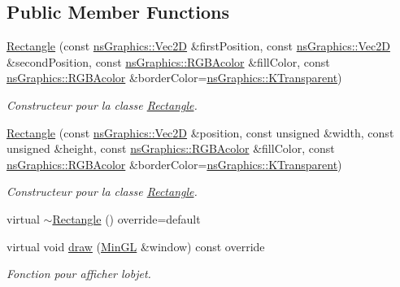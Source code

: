 \subsection*{Public Member Functions}
\begin{DoxyCompactItemize}
\item 
\hyperlink{classns_shape_1_1_rectangle_a5d5e8052ba7c35001a30ccc7dad669e2}{Rectangle} (const \hyperlink{classns_graphics_1_1_vec2_d}{ns\+Graphics\+::\+Vec2D} \&first\+Position, const \hyperlink{classns_graphics_1_1_vec2_d}{ns\+Graphics\+::\+Vec2D} \&second\+Position, const \hyperlink{classns_graphics_1_1_r_g_b_acolor}{ns\+Graphics\+::\+R\+G\+B\+Acolor} \&fill\+Color, const \hyperlink{classns_graphics_1_1_r_g_b_acolor}{ns\+Graphics\+::\+R\+G\+B\+Acolor} \&border\+Color=\hyperlink{namespacens_graphics_ab2001ad03cceb2565849e04465618c1e}{ns\+Graphics\+::\+K\+Transparent})
\begin{DoxyCompactList}\small\item\em Constructeur pour la classe \hyperlink{classns_shape_1_1_rectangle}{Rectangle}. \end{DoxyCompactList}\item 
\hyperlink{classns_shape_1_1_rectangle_a0c1c16410fb0ee7345449d7bfc9b377b}{Rectangle} (const \hyperlink{classns_graphics_1_1_vec2_d}{ns\+Graphics\+::\+Vec2D} \&position, const unsigned \&width, const unsigned \&height, const \hyperlink{classns_graphics_1_1_r_g_b_acolor}{ns\+Graphics\+::\+R\+G\+B\+Acolor} \&fill\+Color, const \hyperlink{classns_graphics_1_1_r_g_b_acolor}{ns\+Graphics\+::\+R\+G\+B\+Acolor} \&border\+Color=\hyperlink{namespacens_graphics_ab2001ad03cceb2565849e04465618c1e}{ns\+Graphics\+::\+K\+Transparent})
\begin{DoxyCompactList}\small\item\em Constructeur pour la classe \hyperlink{classns_shape_1_1_rectangle}{Rectangle}. \end{DoxyCompactList}\item 
virtual \hyperlink{classns_shape_1_1_rectangle_a8c5a662392d6ff84a852c4f70e8b1d1d}{$\sim$\+Rectangle} () override=default
\item 
virtual void \hyperlink{classns_shape_1_1_rectangle_acbe8ed9e23b67090e7638563f2593735}{draw} (\hyperlink{class_min_g_l}{Min\+GL} \&window) const override
\begin{DoxyCompactList}\small\item\em Fonction pour afficher l\textquotesingle{}objet. \end{DoxyCompactList}\item 

\end{DoxyCompactItemize}
